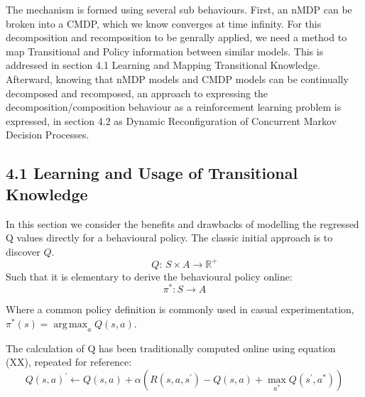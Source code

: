 \documentclass[compsoc,journal,letterpaper,10pt,draftclsnofoot,onecolumn]{IEEEtran}
\DeclareMathOperator*{\argmax}{arg\,max}
\begin{document}
The mechanism is formed using several sub behaviours. First, an nMDP can
be broken into a CMDP, which we know converges at time infinity. For
this decomposition and recomposition to be genrally applied, we need a
method to map Transitional and Policy information between similar
models. This is addressed in section 4.1 Learning and Mapping
Transitional Knowledge. Afterward, knowing that nMDP models and CMDP
models can be continually decomposed and recomposed, an approach to
expressing the decomposition/composition behaviour as a reinforcement
learning problem is expressed, in section 4.2 as Dynamic Reconfiguration
of Concurrent Markov Decision Processes.

\subsection{4.1 Learning and Usage of Transitional
Knowledge}\label{learning-and-usage-of-transitional-knowledge}

In this section we consider the benefits and drawbacks of modelling the
regressed Q values directly for a behavioural policy. The classic
initial approach is to discover \(Q\).
\begin{equation}
Q:\,S \times A \rightarrow \mathbb{R}^{+}
\end{equation}
Such that it is elementary to derive the behavioural policy online:
\begin{equation}
\pi^{*}:S \rightarrow A
\end{equation}

Where a common policy definition is commonly used in casual
experimentation, \(\pi^{*}(s) = \argmax_{a}Q(s,a)\).

The calculation of Q has been traditionally computed online using
equation (XX), repeated for reference:
\begin{equation}
{Q(s,a)}^{'} \leftarrow Q(s,a) + \alpha\left( R\left( s,a,s^{'} \right) - Q\left( s,a \right) + \max_{a^{*}}Q(s^{'},a^{*}) \right)
\end{equation}
\end{document}
